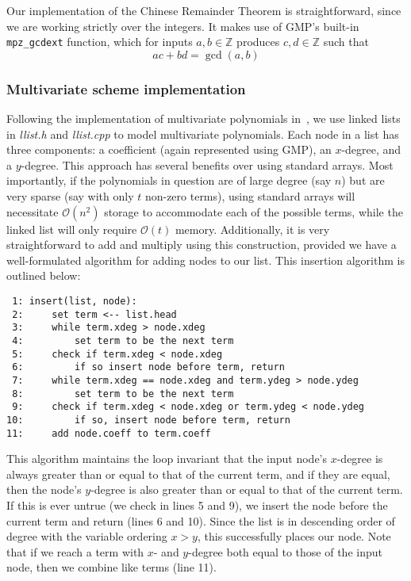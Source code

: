 \documentclass[11pt]{report}
\newcommand{\Z}{\mathbb{Z}}
\newcommand{\bigO}{\mathcal{O}}
\begin{document}
Our implementation of the Chinese Remainder Theorem is straightforward, since we are working strictly over the integers. It makes use of GMP's built-in \verb|mpz_gcdext| function, which for inputs $a,b\in\Z$ produces $c,d\in\Z$ such that
\[ac+bd=\gcd(a,b)\]


\subsubsection{Multivariate scheme implementation}
Following the implementation of multivariate polynomials in~\cite{knuth-vol1}, we use linked lists in \emph{llist.h} and \emph{llist.cpp} to model multivariate polynomials. Each node in a list has three components: a coefficient (again represented using GMP), an $x$-degree, and a $y$-degree. This approach has several benefits over using standard arrays. Most importantly, if the polynomials in question are of large degree (say $n$) but are very sparse (say with only $t$ non-zero terms), using standard arrays will necessitate $\bigO(n^2)$ storage to accommodate each of the possible terms, while the linked list will only require $\bigO(t)$ memory. Additionally, it is very straightforward to add and multiply using this construction, provided we have a well-formulated algorithm for adding nodes to our list. This insertion algorithm is outlined below:

\begin{verbatim}
 1: insert(list, node):
 2:     set term <-- list.head
 3:     while term.xdeg > node.xdeg
 4:         set term to be the next term
 5:     check if term.xdeg < node.xdeg
 6:         if so insert node before term, return
 7:     while term.xdeg == node.xdeg and term.ydeg > node.ydeg
 8:         set term to be the next term
 9:     check if term.xdeg < node.xdeg or term.ydeg < node.ydeg
10:         if so, insert node before term, return
11:     add node.coeff to term.coeff
\end{verbatim}

This algorithm maintains the loop invariant that the input node's $x$-degree is always greater than or equal to that of the current term, and if they are equal, then the node's $y$-degree is also greater than or equal to that of the current term. If this is ever untrue (we check in lines 5 and 9), we insert the node before the current term and return (lines 6 and 10). Since the list is in descending order of degree with the variable ordering $x>y$, this successfully places our node. Note that if we reach a term with $x$- and $y$-degree both equal to those of the input node, then we combine like terms (line 11).
\end{document}
